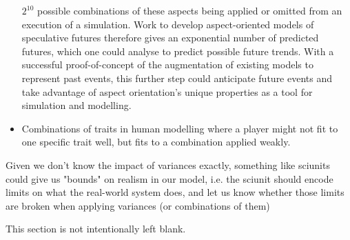 \begin{itemize}
    \(2^{10}\) possible combinations of these aspects being applied or omitted
    from an execution of a simulation. Work to develop aspect-oriented models of
    speculative futures therefore gives an exponential number of predicted
    futures, which one could analyse to predict possible future trends. With a
    successful proof-of-concept of the augmentation of existing models to
    represent past events, this further step could anticipate future events and
    take advantage of aspect orientation's unique properties as a tool for
    simulation and modelling.
    \item Combinations of traits in human modelling where a player might not fit
    to one specific trait well, but fits to a combination applied weakly.
\end{itemize}



Given we don't know the impact of variances exactly, something like sciunits
could give us "bounds" on realism in our model, i.e. the sciunit should encode
limits on what the real-world system does, and let us know whether those limits
are broken when applying variances (or combinations of them)


This section is not intentionally left blank.

